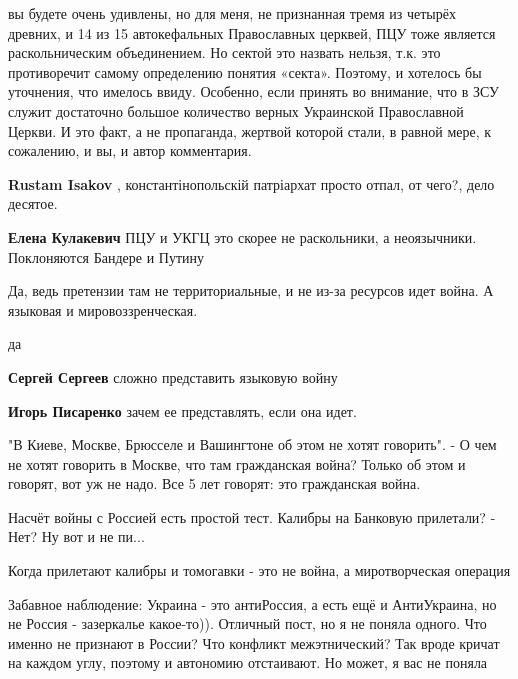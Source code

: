 \begin{itemize}
\begin{itemize}
вы будете очень удивлены, но для меня, не признанная тремя из четырёх древних,
и 14 из 15 автокефальных Православных церквей, ПЦУ тоже является
раскольническим объединением. Но сектой это назвать нельзя, т.к. это
противоречит самому определению понятия «секта». Поэтому, и хотелось бы
уточнения, что имелось ввиду. Особенно, если принять во внимание, что в ЗСУ
служит достаточно большое количество верных Украинской Православной Церкви. И
это факт, а не пропаганда, жертвой которой стали, в равной мере, к сожалению, и
вы, и автор комментария.


\textbf{Rustam Isakov} , константінопольскій патріархат просто отпал, от чего?, дело десятое.

\textbf{Елена Кулакевич} ПЦУ и УКГЦ это скорее не раскольники, а неоязычники. Поклоняются Бандере и Путину
\end{itemize} %


Да, ведь претензии там не территориальные, и не из-за ресурсов идет война. А
языковая и мировоззренческая.

\begin{itemize} %
да

\textbf{Сергей Сергеев} сложно представить языковую войну

\textbf{Игорь Писаренко} зачем ее представлять, если она идет.


"В Киеве, Москве, Брюсселе и Вашингтоне об этом не хотят говорить". - О чем не
хотят говорить в Москве, что там гражданская война? Только об этом и говорят,
вот уж не надо. Все 5 лет говорят: это гражданская война.

\end{itemize} %

Насчёт войны с Россией есть простой тест. Калибры на Банковую прилетали? - Нет? Ну вот и не пи...

\begin{itemize} %
Когда прилетают калибры и томогавки - это не война, а миротворческая операция
\end{itemize} %


Забавное наблюдение: Украина - это антиРоссия, а есть ещё и АнтиУкраина, но не
Россия - зазеркалье какое-то)). Отличный пост, но я не поняла одного. Что
именно не признают в России? Что конфликт межэтнический? Так вроде кричат на
каждом углу, поэтому и автономию отстаивают. Но может, я вас не поняла


\end{itemize}
